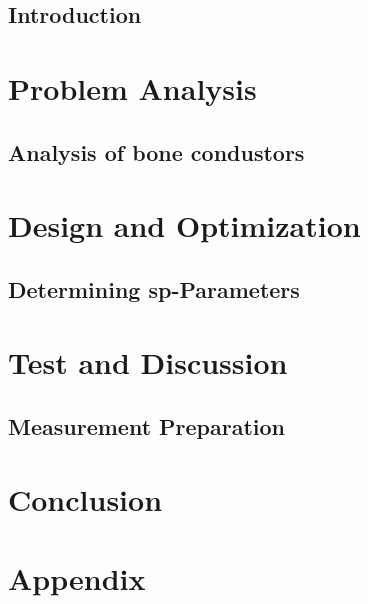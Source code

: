 \glsresetall
 \graphicspath{{figures/analysing/}}
\chapter{Introduction}\label{ch:intro}



\part{Problem Analysis}\label{pt:analysis} \glsresetall
\graphicspath{{figures/analysis/}}
\chapter{Analysis of bone condustors}\label{ch:bone_conductors}





\part{Design and Optimization}\label{pt:design} 
\graphicspath{{figures/design/}}	
\chapter{Determining \gls{sp}-Parameters}\label{ch:optimization}


\part{Test and Discussion}\label{pt:test}
\graphicspath{{figures/tests/}}
\chapter{Measurement Preparation}


 
\part{Conclusion}\label{pt:conclusion}



\glsresetall
\appendix %

 \graphicspath{{figures/appendix/}}
\part{Appendix}\label{pt:appendix}


